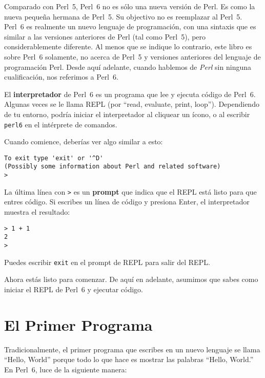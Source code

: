 Comparado con Perl~5, Perl~6 no es sólo una nueva versión de Perl.
Es como la nueva pequeña hermana de Perl~5. Su objectivo no es reemplazar
al Perl~5. Perl~6 es realmente un nuevo lenguaje de programación, con una sintaxis
que es similar a las versiones anteriores de Perl (tal como Perl~5), pero considerablemente
diferente. Al menos que se indique lo contrario, este libro es sobre Perl~6 solamente, no
acerca de Perl~5 y versiones anteriores del lenguaje de programación Perl. Desde aquí adelante,
cuando hablemos de \emph{Perl} sin ninguna cualificación, nos referimos a Perl~6.


El {\bf interpretador} de Perl~6 es un programa que lee y  
ejecuta código de Perl~6. Algunas veces se le llama REPL (por ``read, 
evaluate, print, loop''). Dependiendo de tu entorno, 
podría iniciar el interpretador al cliquear un ícono, o al 
escribir {\tt perl6} en el intérprete de comandos.

Cuando comience, deberías ver algo similar a esto:

\begin{verbatim}
To exit type 'exit' or '^D'
(Possibly some information about Perl and related software)
> 
\end{verbatim}
%

La última línea con {\tt >} es un {\bf prompt} que indica 
que el REPL está listo para que entres código. Si escribes un 
línea de código y presiona Enter, el interpretador muestra el resultado: 

\begin{verbatim}
> 1 + 1
2
>
\end{verbatim}
%
Puedes escribir {\tt exit} en el prompt de REPL para salir del REPL.

Ahora estás listo para comenzar.
De aquí en adelante, asumimos que sabes como iniciar el REPL de Perl~6 y 
ejecutar código.


\section{El Primer Programa}
\label{hello}

Tradicionalmente, el primer programa que escribes en un nuevo lenguaje
se llama ``Hello, World'' porque todo lo que hace es mostrar las palabras
``Hello, World.''  En Perl~6, luce de la siguiente manera:

